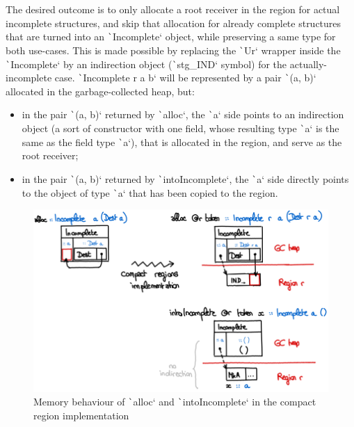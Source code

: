 \documentclass[english]{jflart}
\begin{document}
The desired outcome is to only allocate a root receiver in the region for actual incomplete structures, and skip that allocation for already complete structures that are turned into an \texttt`Incomplete` object, while preserving a same type for both use-cases. This is made possible by replacing the \texttt`Ur` wrapper inside the \texttt`Incomplete` by an 
indirection object (\texttt`stg_IND` symbol) for the actually-incomplete case. \texttt`Incomplete r a b` will be represented by a pair \texttt`(a, b)` allocated in the garbage-collected heap, but:
\begin{itemize}
  \item in the pair \texttt`(a, b)` returned by \texttt`alloc`, the \texttt`a` side points to an indirection object (a sort of constructor with one field, whose resulting type \texttt`a` is the same as the field type \texttt`a`), that is allocated in the region, and serve as the root receiver;
  \item in the pair \texttt`(a, b)` returned by \texttt`intoIncomplete`, the \texttt`a` side directly points to the object of type \texttt`a` that has been copied to the region.
\end{itemize}

\begin{figure}[t]\centering
  \includegraphics[width=14cm]{alloc-region.png}
  \caption{Memory behaviour of \texttt`alloc` and \texttt`intoIncomplete` in the compact region implementation}
  \label{fig:schema-alloc-region}
\end{figure}
\end{document}
